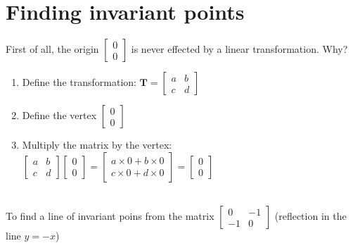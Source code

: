 \documentclass{article}[12pt]
\begin{document}
\section{Finding invariant points}
First of all, the origin $\begin{bmatrix}0\\0\end{bmatrix}$ is never effected by a linear transformation. Why?
\begin{minipage}{\textwidth}
\begin{enumerate}
\item Define the transformation:
\(\boldsymbol{T} = \begin{bmatrix} a & b \\ c & d\end{bmatrix}\)
\item Define the vertex $ \begin{bmatrix} 0 \\ 0\end{bmatrix}$
\item Multiply the matrix by the vertex: \(\begin{bmatrix} a & b \\ c & d\end{bmatrix}\begin{bmatrix} 0 \\ 0\end{bmatrix} = \begin{bmatrix} a \times 0 + b \times 0 \\ c \times 0 + d \times 0\end{bmatrix} = \begin{bmatrix} 0 \\ 0\end{bmatrix}\)
\end{enumerate}
\end{minipage}
\\
To find a line of invariant poins from the matrix $\begin{bmatrix} 0 & -1 \\ -1 & 0\end{bmatrix}$ (reflection in the line $y=-x$)
\end{document}
